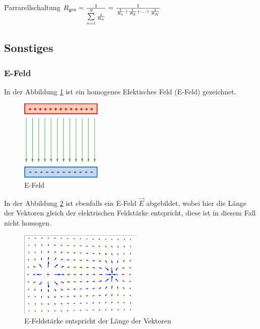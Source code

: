 \documentclass[a4paper]{scrartcl}
\begin{document}
Parrarellschaltung
$
R_\mathrm{ges} = {1 \over {\sum\limits_{n=1}^N {1 \over R_n}}} = {1 \over {{1 \over R_1} + {1 \over R_2} + \ldots + {1 \over R_N}}}$





\subsection{Sonstiges}



\subsubsection{E-Feld}

In der Abbildung \ref{fig:E-Feld} ist ein homogenes Elektisches Feld (E-Feld) gezeichnet.

\begin{figure}[h!]
\begin{center}
\includegraphics[scale=0.5]{images/E-Feld.jpg}
\caption{E-Feld}
\label{fig:E-Feld}
\end{center}
\end{figure}

In der Abbildung \ref{fig:E-Feldstaerke} ist ebenfalls ein E-Feld $ \vec{E} $ abgebildet, wobei hier die Länge der Vektoren gleich der elektrischen Feldstärke entspricht, diese ist in diesem Fall nicht homogen.

\begin{figure}[h!]
\begin{center}
\includegraphics[scale=0.5]{images/E-Feldstaerke.png}
\caption{E-Feldstärke entspricht der Länge der Vektoren}
\label{fig:E-Feldstaerke}
\end{center}
\end{figure}
\end{document}
